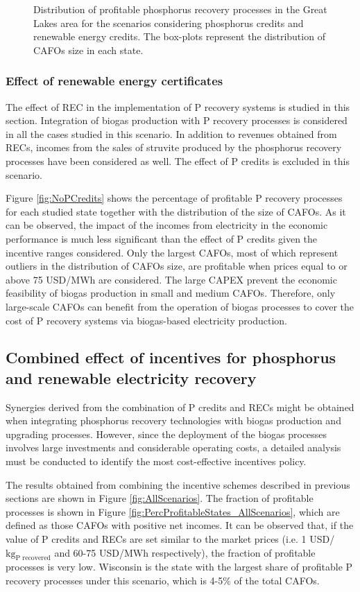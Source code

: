 \begin{refsection}[referencesCh5]
\begin{figure}[h!]
	\caption{Distribution of profitable phosphorus recovery processes in the Great Lakes area for the scenarios considering phosphorus credits and renewable energy credits. The box-plots represent the distribution of CAFOs size in each state.}
	\label{fig:SingleIncentives}
\end{figure}

\subsubsection{Effect of renewable energy certificates}\label{section:Electricity_price}
The effect of REC in the implementation of P recovery systems is studied in this section. Integration of biogas production with P recovery processes is considered in all the cases studied in this scenario. In addition to revenues obtained from RECs, incomes from the sales of struvite produced by the phosphorus recovery processes have been considered as well. The effect of P credits is excluded in this scenario.

Figure \ref{fig:NoPCredits} shows the percentage of profitable P recovery processes for each studied state together with the distribution of the size of CAFOs. As it can be observed, the impact of the incomes from electricity in the economic performance is much less significant than the effect of P credits given the incentive ranges considered. Only the largest CAFOs, most of which represent outliers in the distribution of CAFOs size, are profitable when prices equal to or above 75 USD/MWh are considered. The large CAPEX prevent the economic feasibility of biogas production in small and medium CAFOs. Therefore, only large-scale CAFOs can benefit from the operation of biogas processes to cover the cost of P recovery systems via biogas-based electricity production.

\subsection{Combined effect of incentives for phosphorus and renewable electricity recovery}\label{section:CombIncent}
Synergies derived from the combination of P credits and RECs might be obtained when integrating phosphorus recovery technologies with biogas production and upgrading processes.
However, since the deployment of the biogas processes involves large investments and considerable operating costs, a detailed analysis must be conducted to identify the most cost-effective incentives policy. 

The results obtained from combining the incentive schemes described in previous sections are shown in Figure \ref{fig:AllScenarios}. The fraction of profitable processes is shown in Figure \ref{fig:PercProfitableStates_AllScenarios}, which are defined as those CAFOs with positive net incomes. It can be observed that, if the value of P credits and RECs are set similar to the market prices (i.e. 1 USD/$\text{kg}_\text{P recovered}$ and 60-75 USD/MWh respectively), the fraction of profitable processes is very low. Wisconsin is the state with the largest share of profitable P recovery processes under this scenario, which is 4-5\% of the total CAFOs.


\end{refsection}
